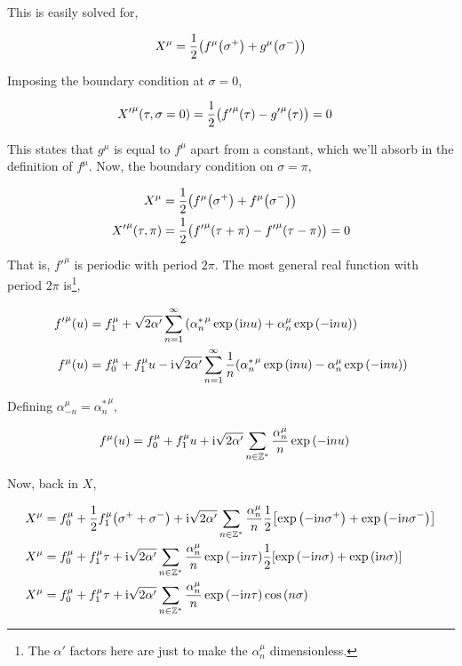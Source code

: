 This is easily solved for,

\begin{align*}
    X^\mu=\frac12\qty(f^\mu\qty(\sigma^+)+g^\mu\qty(\sigma^-))
\end{align*}

Imposing the boundary condition at $\sigma=0$,

\begin{align*}
    {X'}^\mu\qty(\tau,\sigma=0)&=\frac12\qty({f'}^\mu\qty(\tau)-{g'}^\mu\qty(\tau))=0
\end{align*}

This states that $g^\mu$ is equal to $f^\mu$ apart from a constant, which we'll absorb in the definition of $f^\mu$. Now, the boundary condition 
on $\sigma=\pi$,

\begin{align*}
    X^\mu&=\frac12\qty(f^\mu\qty(\sigma^+)+f^\mu\qty(\sigma^-))\\
    {X'}^\mu\qty(\tau,\pi)&=\frac12\qty({f'}^\mu\qty(\tau+\pi)-{f'}^\mu\qty(\tau-\pi))=0
\end{align*}

That is, ${f'}^\mu$ is periodic with period $2\pi$. The most general real function with period $2\pi$ is\footnote{The $\alpha'$ factors here are just to make the $\alpha_n^\mu$ dimensionless.},

\begin{align*}
    {f'}^\mu\qty(u)&=f_1^\mu+\sqrt{2\alpha'}\sum\limits_{n=1}^\infty\qty({\alpha^\ast_n}^\mu\exp\qty(\textnormal{i} n u)+\alpha_n^\mu\exp\qty(-\textnormal{i} n u))\\
    f^\mu\qty(u)&=f_0^\mu+f_1^\mu u-\textnormal{i}\sqrt{2\alpha'}\sum\limits_{n=1}^\infty\frac1n\qty({\alpha^\ast_n}^\mu\exp\qty(\textnormal{i} n u)-\alpha_n^\mu\exp\qty(-\textnormal{i} n u))
\end{align*}

Defining $\alpha_{-n}^\mu={\alpha^\ast_n}^\mu$,

\begin{align*}
    f^\mu\qty(u)&=f_0^\mu+f_1^\mu u+\textnormal{i}\sqrt{2\alpha'}\sum\limits_{n\in\mathbb Z^\ast}\frac{\alpha_n^\mu}{n}\exp\qty(-\textnormal{i} n u)
\end{align*}

Now, back in $X$,

\begin{align*}
    X^\mu&=f_0^\mu+\frac12f_1^\mu\qty(\sigma^++\sigma^-)+\textnormal{i}\sqrt{2\alpha'}\sum\limits_{n\in\mathbb Z^\ast}\frac{\alpha_n^\mu}{n}\frac12\qty[\exp\qty(-\textnormal{i} n \sigma^+)+\exp\qty(-\textnormal{i} n\sigma^-)]\\
    X^\mu&=f_0^\mu+f_1^\mu\tau+\textnormal{i}\sqrt{2\alpha'}\sum\limits_{n\in\mathbb Z^\ast}\frac{\alpha_n^\mu}{n}\exp\qty(-\textnormal{i} n\tau)\frac12\qty[\exp\qty(-\textnormal{i} n \sigma)+\exp\qty(\textnormal{i} n\sigma)]\\
    X^\mu&=f_0^\mu+f_1^\mu\tau+\textnormal{i}\sqrt{2\alpha'}\sum\limits_{n\in\mathbb Z^\ast}\frac{\alpha_n^\mu}{n}\exp\qty(-\textnormal{i} n\tau)\cos\qty(n\sigma)   
\end{align*}

